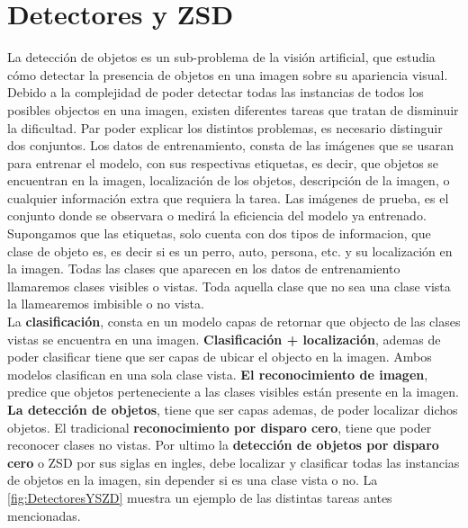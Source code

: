 \section{Detectores y ZSD}
La detección de objetos es un sub-problema de la visión artificial, que estudia cómo detectar la presencia de objetos en una imagen sobre su apariencia visual. Debido a la complejidad de poder detectar todas las instancias de todos los posibles objectos en una imagen, existen diferentes tareas que tratan de disminuir la dificultad.  Par poder explicar los distintos problemas, es necesario distinguir dos conjuntos. Los datos de entrenamiento, consta de las imágenes que se usaran para entrenar el modelo, con sus respectivas etiquetas, es decir, que objetos se encuentran en la imagen, localización de los objetos, descripción de la imagen, o cualquier información extra que requiera la tarea. Las imágenes de prueba, es el conjunto donde se observara o medirá la eficiencia del modelo ya entrenado. Supongamos que las etiquetas, solo cuenta con dos tipos de informacion, que clase de objeto es, es decir si es un perro, auto, persona, etc. y su localización en la imagen. Todas las clases que aparecen en los datos de entrenamiento llamaremos clases visibles o vistas. Toda aquella clase que no sea una clase vista la llamearemos imbisible o no vista.\\
La \textbf{clasificación}, consta en un modelo capas de retornar que objecto de las clases vistas se encuentra  en una imagen.\textbf{ Clasificación + localización}, ademas de poder clasificar tiene que ser capas de ubicar el objecto en la imagen. Ambos modelos clasifican en una sola clase vista.\textbf{ El reconocimiento de imagen}, predice que objetos perteneciente a las clases visibles están presente en la imagen. \textbf{La detección de objetos}, tiene que ser capas ademas, de poder localizar dichos objetos. El tradicional \textbf{reconocimiento por disparo cero}, tiene que poder reconocer clases no vistas. Por ultimo la \textbf{detección de objetos por disparo cero} o ZSD por sus siglas en ingles, debe localizar y clasificar todas las instancias de objetos en la imagen, sin depender si es una clase vista o no. La \autoref{fig:DetectoresYSZD} muestra un ejemplo de las distintas tareas antes mencionadas. \\
